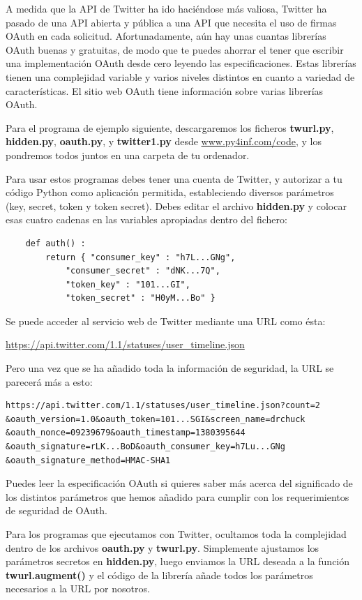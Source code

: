 A medida que la API de Twitter ha ido haciéndose más valiosa, Twitter
ha pasado de una API abierta y pública a una API que necesita
el uso de firmas OAuth en cada solicitud. Afortunadamente,
aún hay unas cuantas librerías OAuth buenas y gratuitas,
de modo que te puedes ahorrar el tener que escribir una implementación OAuth
desde cero leyendo las especificaciones. Estas librerías tienen
una complejidad variable y varios niveles distintos en cuanto a variedad de características.
El sitio web OAuth tiene información sobre varias librerías OAuth.

Para el programa de ejemplo siguiente, descargaremos los ficheros
{\bf twurl.py}, {\bf hidden.py}, 
{\bf oauth.py}, 
y
{\bf twitter1.py} desde
\url{www.py4inf.com/code}, y los pondremos todos juntos en una carpeta
de tu ordenador.

Para usar estos programas debes tener una cuenta de Twitter,
y autorizar a tu código Python como aplicación permitida,
estableciendo diversos parámetros (key, secret, token y token secret). Debes editar
el archivo {\bf hidden.py} y colocar esas cuatro cadenas en las
variables apropiadas dentro del fichero:

\beforeverb
\begin{verbatim}
    def auth() :
        return { "consumer_key" : "h7L...GNg",
            "consumer_secret" : "dNK...7Q",
            "token_key" : "101...GI",
            "token_secret" : "H0yM...Bo" }
\end{verbatim}
\afterverb
%
Se puede acceder al servicio web de Twitter mediante una URL como ésta:

\url{https://api.twitter.com/1.1/statuses/user_timeline.json}

Pero una vez que se ha añadido toda la información de seguridad, la URL
se parecerá más a esto:

\beforeverb
\begin{verbatim}
https://api.twitter.com/1.1/statuses/user_timeline.json?count=2
&oauth_version=1.0&oauth_token=101...SGI&screen_name=drchuck
&oauth_nonce=09239679&oauth_timestamp=1380395644
&oauth_signature=rLK...BoD&oauth_consumer_key=h7Lu...GNg
&oauth_signature_method=HMAC-SHA1
\end{verbatim}
\afterverb
%
Puedes leer la especificación OAuth si quieres saber más
acerca del significado de los distintos parámetros que
hemos añadido para cumplir con los requerimientos de seguridad de OAuth.

Para los programas que ejecutamos con Twitter, ocultamos toda la
complejidad dentro de los archivos {\bf oauth.py} y {\bf twurl.py}.
Simplemente ajustamos los parámetros secretos en {\bf hidden.py}, luego
enviamos la URL deseada a la función {\bf twurl.augment()}
y el código de la librería añade todos los parámetros
necesarios a la URL por nosotros.

